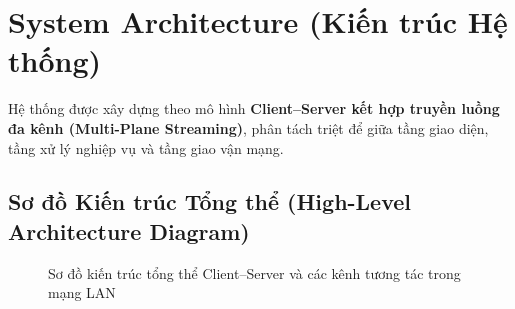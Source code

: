 \section{System Architecture (Kiến trúc Hệ thống)}

Hệ thống được xây dựng theo mô hình \textbf{Client--Server kết hợp truyền luồng đa kênh (Multi-Plane Streaming)}, phân tách triệt để giữa tầng giao diện, tầng xử lý nghiệp vụ và tầng giao vận mạng.

\subsection{Sơ đồ Kiến trúc Tổng thể (High-Level Architecture Diagram)}

\begin{figure}[H]
    \centering
    \caption{Sơ đồ kiến trúc tổng thể Client--Server và các kênh tương tác trong mạng LAN}
    \label{fig:system_architecture}
\end{figure}

